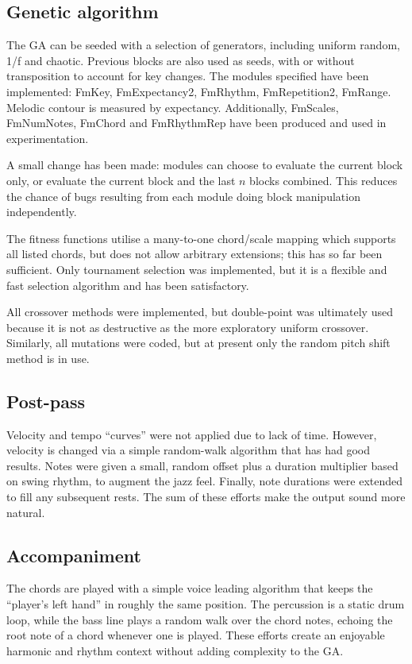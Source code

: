 \subsection{Genetic algorithm}

The GA can be seeded with a selection of generators, including uniform random, 1/f and chaotic. Previous blocks are also used as seeds, with or without transposition to account for key changes. The modules specified have been implemented: FmKey, FmExpectancy2, FmRhythm, FmRepetition2, FmRange. Melodic contour is measured by expectancy. Additionally, FmScales, FmNumNotes, FmChord  and FmRhythmRep have been produced and used in experimentation.

A small change has been made: modules can choose to evaluate the current block only, or evaluate the current block and the last $n$ blocks combined. This reduces the chance of bugs resulting from each module doing block manipulation independently.

The fitness functions utilise a many-to-one chord/scale mapping which supports all listed chords, but does not allow arbitrary extensions; this has so far been sufficient. Only tournament selection was implemented, but it is a flexible and fast selection algorithm and has been satisfactory.

All crossover methods were implemented, but double-point was ultimately used because it is not as destructive as the more exploratory uniform crossover. Similarly, all mutations were coded, but at present only the random pitch shift method is in use.

\subsection{Post-pass}

Velocity and tempo ``curves'' were not applied due to lack of time. However, velocity is changed via a simple random-walk algorithm that has had good results. Notes were given a small, random offset plus a duration multiplier based on swing rhythm, to augment the jazz feel. Finally, note durations were extended to fill any subsequent rests. The sum of these efforts make the output sound more natural.

\subsection{Accompaniment}

The chords are played with a simple voice leading algorithm that keeps the ``player's left hand'' in roughly the same position. The percussion is a static drum loop, while the bass line plays a random walk over the chord notes, echoing the root note of a chord whenever one is played. These efforts create an enjoyable harmonic and rhythm context without adding complexity to the GA.

